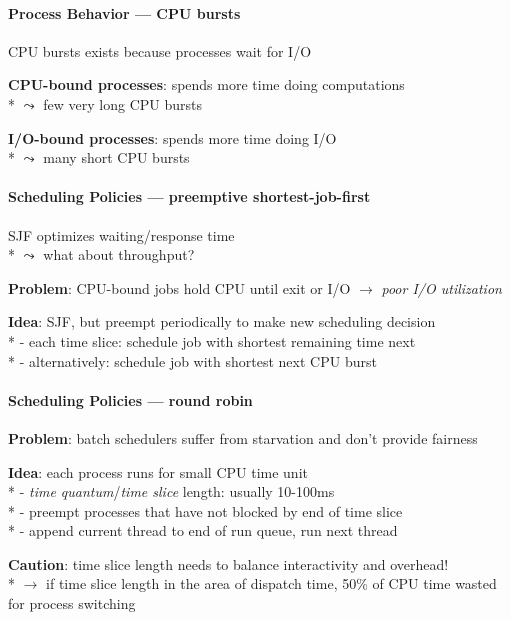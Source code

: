 \paragraph{Process Behavior --- CPU bursts}
\begin{items}
  \item CPU bursts exists because processes wait for I/O
  \item \textbf{CPU-bound processes}: spends more time doing computations \\*
    \( \leadsto \) few very long CPU bursts
  \item \textbf{I/O-bound processes}: spends more time doing I/O \\*
    \( \leadsto \) many short CPU bursts
\end{items}

\paragraph{Scheduling Policies --- preemptive shortest-job-first}
\begin{items}
  \item SJF optimizes waiting/response time \\*
    \( \leadsto \) what about throughput?
  \item \textbf{Problem}: CPU-bound jobs hold CPU until exit or I/O \( \to \) \emph{poor I/O utilization}
  \item \textbf{Idea}: SJF, but preempt periodically to make new scheduling decision \\*
    - each time slice: schedule job with shortest remaining time next \\*
    - alternatively: schedule job with shortest next CPU burst
\end{items}

\paragraph{Scheduling Policies --- round robin}
\begin{items}
  \item \textbf{Problem}: batch schedulers suffer from starvation and don't provide fairness
  \item \textbf{Idea}: each process runs for small CPU time unit \\*
    - \emph{time quantum}/\emph{time slice} length: usually 10-100ms \\*
    - preempt processes that have not blocked by end of time slice \\*
    - append current thread to end of run queue, run next thread
  \item \textbf{Caution}: time slice length needs to balance interactivity and overhead! \\*
    \( \to \) if time slice length in the area of dispatch time, 50\% of CPU time wasted for process switching
\end{items}

